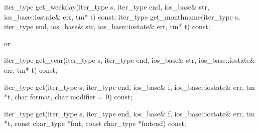 %
%
%
%
\begin{itemdecl}
iter_type get_weekday(iter_type s, iter_type end, ios_base& str,
                      ios_base::iostate& err, tm* t) const;
iter_type get_monthname(iter_type s, iter_type end, ios_base& str,
                        ios_base::iostate& err, tm* t) const;
\end{itemdecl}

\begin{itemdescr}
\pnum
\returns
{}
or
\end{itemdescr}

%
%
\begin{itemdecl}
iter_type get_year(iter_type s, iter_type end, ios_base& str,
                   ios_base::iostate& err, tm* t) const;
\end{itemdecl}

\begin{itemdescr}
\pnum
\returns
{}
\end{itemdescr}

%
%
\begin{itemdecl}
iter_type get(iter_type s, iter_type end, ios_base& f,
    ios_base::iostate& err, tm *t, char format, char modifier = 0) const;
\end{itemdecl}

\begin{itemdescr}
\pnum
\returns {}
\end{itemdescr}

%
%
\begin{itemdecl}
iter_type get(iter_type s, iter_type end, ios_base& f,
    ios_base::iostate& err, tm *t, const char_type *fmt, const char_type *fmtend) const;
\end{itemdecl}

